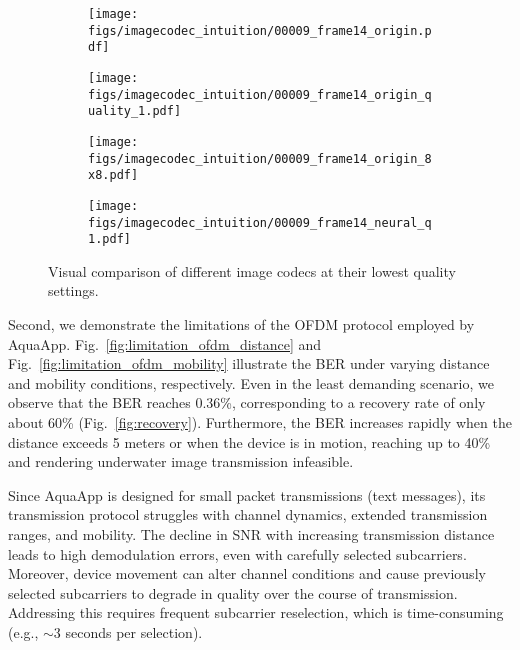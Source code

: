 \begin{figure}[t]
    \centering
    \begin{subfigure}[b]{.22\linewidth}
        \centering
        \texttt{[image: figs/imagecodec\_intuition/00009\_frame14\_origin.pdf]}
        \label{fig:00009_frame14_origin}
    \end{subfigure}
    \begin{subfigure}[b]{.22\linewidth}
        \centering
        \texttt{[image: figs/imagecodec\_intuition/00009\_frame14\_origin\_quality\_1.pdf]}
        \label{fig:00009_frame14_origin_quality_1}
    \end{subfigure}
    \begin{subfigure}[b]{.22\linewidth}
        \centering
        \texttt{[image: figs/imagecodec\_intuition/00009\_frame14\_origin\_8x8.pdf]}
        \label{fig:00009_frame14_origin_8x8}
    \end{subfigure}
        \begin{subfigure}[b]{.22\linewidth}
        \centering
        \texttt{[image: figs/imagecodec\_intuition/00009\_frame14\_neural\_q1.pdf]}
        \label{fig:00009_frame14_origin_8x8}
    \end{subfigure}
    \caption{Visual comparison of different image codecs at their lowest quality settings.}
    \label{fig:semantic_vs_pixel}
\end{figure}







 Second, we demonstrate the limitations of the OFDM protocol employed by AquaApp.
Fig.~\ref{fig:limitation_ofdm_distance} and Fig.~\ref{fig:limitation_ofdm_mobility} illustrate the BER under varying distance and mobility conditions, respectively.
Even in the least demanding scenario, we observe that the BER reaches 0.36\%,
corresponding to a recovery rate of only about 60\% (Fig.~\ref{fig:recovery}).
Furthermore, the BER increases rapidly when the distance exceeds 5 meters or
when the device is in motion, reaching up to 40\% and rendering underwater image transmission infeasible.

Since AquaApp is designed for small packet transmissions (\ie text messages), its transmission protocol struggles with channel dynamics, extended transmission ranges, and mobility. The decline in SNR with increasing transmission distance leads to high demodulation errors, even with carefully selected subcarriers.
Moreover, device movement can alter channel conditions and cause previously
selected subcarriers to degrade in quality over the course of transmission.
Addressing this requires frequent subcarrier reselection, which is
time-consuming (e.g., $\sim$3 seconds per selection).



